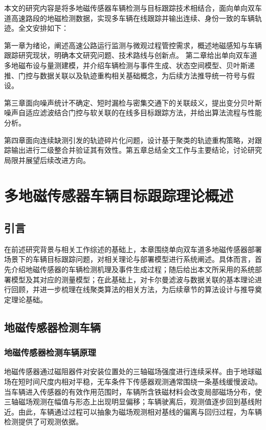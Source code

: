 \documentclass{xdupgthesis}
\begin{document}
本文的研究内容是将多地磁传感器车辆检测与目标跟踪技术相结合，面向单向双车道高速路段的地磁检测数据，实现多车辆在线跟踪并输出连续、身份一致的车辆轨迹。全文安排如下：

第一章为绪论，阐述高速公路运行监测与微观过程管控需求，概述地磁感知与车辆跟踪研究现状，明确本文研究问题、技术路线与创新点。
第二章给出单向双车道多地磁布设与量测建模，并介绍车辆检测与事件生成、状态空间模型、贝叶斯递推、门控与数据关联以及轨迹重构相关基础概念，为后续方法推导统一符号与假设。

第三章面向噪声统计不确定、短时漏检与密集交通下的关联歧义，提出变分贝叶斯噪声自适应滤波结合门控与软关联的在线多目标跟踪方法，并给出算法流程与性能分析。

第四章面向连续缺测引发的轨迹碎片化问题，设计基于聚类的轨迹重构策略，对跟踪输出进行二级整合并验证其有效性。第五章总结全文工作与主要结论，讨论研究局限并展望后续改进方向。





\chapter{多地磁传感器车辆目标跟踪理论概述}
\label{ch:ch2_event_detect}

\section{引言}\label{sec:ch2_intro}

在前述研究背景与相关工作综述的基础上，本章围绕单向双车道多地磁传感器部署场景下的车辆目标跟踪问题，对相关理论与部署模型进行系统阐述。具体而言，首先介绍地磁传感器的车辆检测机理及事件生成过程；随后给出本文所采用的系统部署模型及其对应的测量模型；在此基础上，对卡尔曼滤波与数据关联的基本理论进行回顾，并进一步梳理在线聚类算法的相关方法，为后续章节的算法设计与推导奠定理论基础。


\section{地磁传感器检测车辆}\label{sec:ch2_principle}

\subsection{地磁传感器检测车辆原理}\label{sec:ch2_basic}

地磁传感器通过磁阻器件对安装位置处的三轴磁场强度进行连续采样。由于地球磁场在短时间尺度内相对平稳，无车条件下传感器观测通常围绕一条基线缓慢波动。当车辆进入传感器的有效作用范围时，车辆所含铁磁材料会改变局部磁场分布，使三轴磁场观测在幅值与形态上出现明显偏移；车辆驶离后，观测值逐步回到基线附近。由此，车辆通过过程可以抽象为磁场观测相对基线的偏离与回归过程，为车辆检测提供了可观测依据\cite{haoui2008wirelessmagnetic}。
\end{document}
